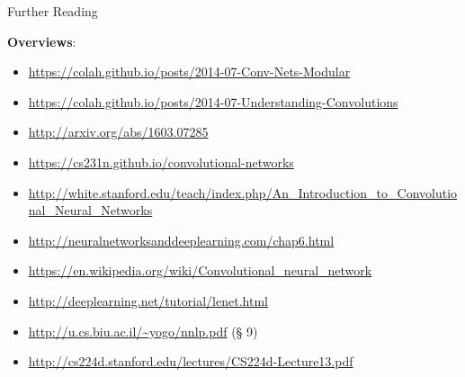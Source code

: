 \documentclass[xcolor=pdftex,x11names,table,hyperref]{beamer}
\begin{document}
\begin{frame}{Further Reading}

\textbf{Overviews}: \\[0.5em]
\begin{minipage}{1.1\textwidth}
\begin{tiny}
\begin{itemize}
	\item \url{https://colah.github.io/posts/2014-07-Conv-Nets-Modular}
	\item \url{https://colah.github.io/posts/2014-07-Understanding-Convolutions}
	\item \url{http://arxiv.org/abs/1603.07285}
	\item \url{https://cs231n.github.io/convolutional-networks}
	\item \url{http://white.stanford.edu/teach/index.php/An_Introduction_to_Convolutional_Neural_Networks}
	\item \url{http://neuralnetworksanddeeplearning.com/chap6.html}
	\item \url{https://en.wikipedia.org/wiki/Convolutional_neural_network}
	\item \url{http://deeplearning.net/tutorial/lenet.html}
	\item \url{http://u.cs.biu.ac.il/~yogo/nnlp.pdf} (\S{} 9)
	\item \url{http://cs224d.stanford.edu/lectures/CS224d-Lecture13.pdf}
\end{itemize}
\end{tiny}
\end{minipage}


\end{frame}
\end{document}
